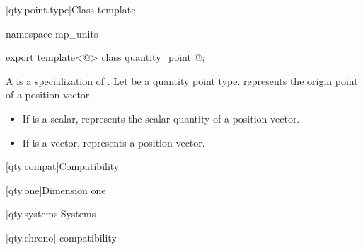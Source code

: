[qty.point.type]{Class template }

\begin{codeblock}
namespace mp_units {

export template<@\unspec@>
class quantity_point { @\unspec@ };

}
\end{codeblock}

A  is a specialization of .
Let  be a quantity point type.
 represents
the origin point of a position vector.
\begin{itemize}
\item
If  is a scalar,
 represents the scalar quantity
of a position vector.
\item
If  is a vector,
 represents a position vector.
\end{itemize}

[qty.compat]{Compatibility}

[qty.one]{Dimension one}

[qty.systems]{Systems}

[qty.chrono]{ compatibility}
